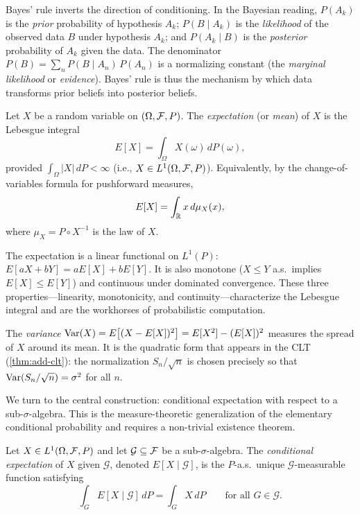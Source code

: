 \begin{remark}
Bayes' rule inverts the direction of conditioning. In the Bayesian reading, $P(A_k)$ is the \emph{prior} probability of hypothesis $A_k$; $P(B \mid A_k)$ is the \emph{likelihood} of the observed data $B$ under hypothesis $A_k$; and $P(A_k \mid B)$ is the \emph{posterior} probability of $A_k$ given the data. The denominator $P(B) = \sum_n P(B \mid A_n)\, P(A_n)$ is a normalizing constant (the \emph{marginal likelihood} or \emph{evidence}). Bayes' rule is thus the mechanism by which data transforms prior beliefs into posterior beliefs.
\end{remark}

\begin{definition}[Expectation]\label{def:expectation}
Let $X$ be a random variable on $(\Omega, \mathcal{F}, P)$. The \emph{expectation} (or \emph{mean}) of $X$ is the Lebesgue integral
\[
E[X] = \int_\Omega X(\omega)\, dP(\omega),
\]
provided $\int_\Omega |X|\, dP < \infty$ (i.e., $X \in L^1(\Omega, \mathcal{F}, P)$). Equivalently, by the change-of-variables formula for pushforward measures,
\[
E[X] = \int_{\mathbb{R}} x\, d\mu_X(x),
\]
where $\mu_X = P \circ X^{-1}$ is the law of $X$.
\end{definition}

\begin{remark}
The expectation is a linear functional on $L^1(P)$: $E[aX + bY] = aE[X] + bE[Y]$. It is also monotone ($X \leq Y$ a.s.\ implies $E[X] \leq E[Y]$) and continuous under dominated convergence. These three properties---linearity, monotonicity, and continuity---characterize the Lebesgue integral and are the workhorses of probabilistic computation.
\end{remark}

\begin{remark}[Variance]
The \emph{variance} $\operatorname{Var}(X) = E\bigl[(X - E[X])^2\bigr] = E[X^2] - (E[X])^2$ measures the spread of $X$ around its mean. It is the quadratic form that appears in the CLT (\cref{thm:add-clt}): the normalization $S_n / \sqrt{n}$ is chosen precisely so that $\operatorname{Var}(S_n / \sqrt{n}) = \sigma^2$ for all $n$.
\end{remark}

We turn to the central construction: conditional expectation with respect to a sub-$\sigma$-algebra. This is the measure-theoretic generalization of the elementary conditional probability and requires a non-trivial existence theorem.

\begin{definition}\label{def:cond-exp}
Let $X \in L^1(\Omega, \mathcal{F}, P)$ and let $\mathcal{G} \subseteq \mathcal{F}$ be a sub-$\sigma$-algebra. The \emph{conditional expectation} of $X$ given $\mathcal{G}$, denoted $E[X \mid \mathcal{G}]$, is the $P$-a.s.\ unique $\mathcal{G}$-measurable function satisfying
\begin{equation}\label{eq:cond-exp}
\int_G E[X \mid \mathcal{G}]\, dP = \int_G X\, dP \qquad \text{for all } G \in \mathcal{G}.
\end{equation}
\end{definition}

